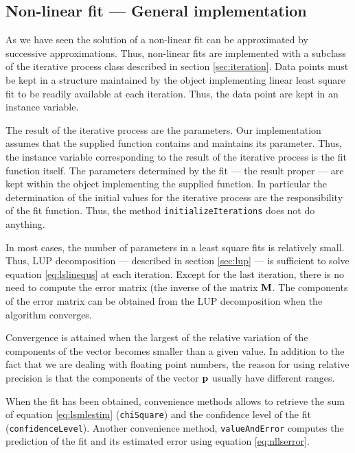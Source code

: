 \documentclass[twoside]{book}
\begin{document}
\subsection{Non-linear fit --- General implementation}
 As we have seen the solution of a
non-linear fit can be approximated by successive approximations.
Thus, non-linear fits are implemented with a subclass of the
iterative process class described in section \ref{sec:iteration}.
Data points must be kept in a structure maintained by the object
implementing linear least square fit to be readily available at
each iteration. Thus, the data point are kept in an instance
variable.

The result of the iterative process are the parameters. Our
implementation assumes that the supplied function contains and
maintains its parameter. Thus, the instance variable corresponding
to the result of the iterative process is the fit function itself.
The parameters determined by the fit --- the result proper --- are
kept within the object implementing the supplied function. In
particular the determination of the initial values for the
iterative process are the responsibility of the fit function.
Thus, the method {\tt initializeIterations} does not do anything.

In most cases, the number of parameters in a least square fits is
relatively small. Thus, LUP decomposition --- described in section
\ref{sec:lup} --- is sufficient to solve equation
\ref{eq:lslinequs} at each iteration. Except for the last
iteration, there is no need to compute the error matrix (the
inverse of the matrix ${\bf M}$. The components of the error
matrix can be obtained from the LUP decomposition when the
algorithm converges.

Convergence is attained when the largest of the relative variation
of the components of the vector becomes smaller than a given
value. In addition to the fact that we are dealing with floating
point numbers, the reason for using relative precision is that the
components of the vector ${\bf p}$ usually have different ranges.

When the fit has been obtained, convenience methods allows to
retrieve the sum of equation \ref{eq:lsmlestim} ({\tt chiSquare})
and the confidence level of the fit ({\tt confidenceLevel}).
Another convenience method, {\tt valueAndError} computes the
prediction of the fit and its estimated error using equation
\ref{eq:nllserror}.
\end{document}
